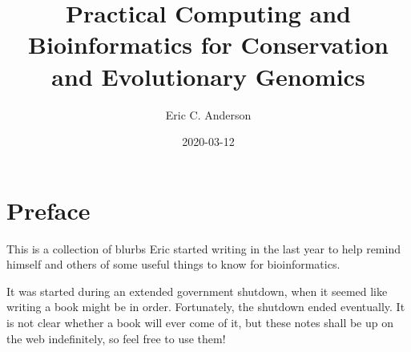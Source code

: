 \documentclass[]{krantz}
\title{Practical Computing and Bioinformatics for Conservation and Evolutionary Genomics}
\author{Eric C. Anderson}
\date{2020-03-12}
\begin{document}
\maketitle


\thispagestyle{empty}

\begin{center}

\end{center}

\setlength{\abovedisplayskip}{-5pt}
\setlength{\abovedisplayshortskip}{-5pt}

{
\hypersetup{linkcolor=}
\setcounter{tocdepth}{2}
\tableofcontents
}
\listoftables
\listoffigures
\newcommand{\bitsfa}{{\circ}{\circ}{\circ}{\bullet}}
\newcommand{\bitsfb}{{\circ}{\circ}{\bullet}{\circ}}
\newcommand{\bitsfc}{{\circ}{\bullet}{\circ}{\circ}}
\newcommand{\bitsfd}{{\bullet}{\circ}{\circ}{\circ}}
\newcommand{\bitsopen}{{\circ}{\circ}{\circ}{\circ}}

\newcommand{\bitsa}{\bitsopen~\bitsopen~\bitsfa}
\newcommand{\bitsb}{\bitsopen~\bitsopen~\bitsfb}
\newcommand{\bitsc}{\bitsopen~\bitsopen~\bitsfc}
\newcommand{\bitsd}{\bitsopen~\bitsopen~\bitsfd}

\newcommand{\bitse}{\bitsopen~\bitsfa~\bitsopen}
\newcommand{\bitsf}{\bitsopen~\bitsfb~\bitsopen}
\newcommand{\bitsg}{\bitsopen~\bitsfc~\bitsopen}
\newcommand{\bitsh}{\bitsopen~\bitsfd~\bitsopen}

\newcommand{\bitsi}{\bitsfa~\bitsopen~\bitsopen}
\newcommand{\bitsj}{\bitsfb~\bitsopen~\bitsopen}
\newcommand{\bitsk}{\bitsfc~\bitsopen~\bitsopen}
\newcommand{\bitsl}{\bitsfd~\bitsopen~\bitsopen}
\newcommand{\bitsmany}{\bitsopen~{\circ}{\bullet}{\circ}{\bullet}~{\circ}{\circ}{\bullet}{\bullet}}

\hypertarget{preface}{%
\chapter*{Preface}\label{preface}}


This is a collection of blurbs Eric started writing in the last year to
help remind himself and others of some useful things to know for bioinformatics.

It was started during an extended government shutdown, when it seemed like writing a book
might be in order. Fortunately, the shutdown ended eventually. It is not clear whether a
book will ever come of it, but these notes shall be up on the web indefinitely, so feel free to use
them!
\end{document}
